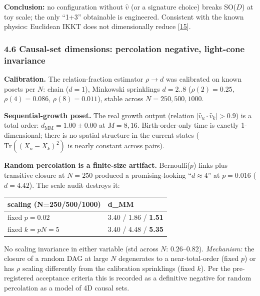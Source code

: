\textbf{Conclusion:} no configuration without \(\hat v\) (or a signature
choice) breaks SO(\(D\)) at toy scale; the only ``1+3'' obtainable is
engineered. Consistent with the known physics: Euclidean IKKT does not
dimensionally reduce {[}\hyperref[ref-15]{15}{]}.

\subsubsection{4.6 Causal-set dimensions: percolation negative,
light-cone
invariance}\label{causal-set-dimensions-percolation-negative-light-cone-invariance}

\textbf{Calibration.} The relation-fraction estimator \(\rho \to d\) was
calibrated on known posets per \(N\): chain (\(d{=}1\)), Minkowski
sprinklings \(d{=}2..8\) (\(\rho(2){=}0.25\), \(\rho(4){=}0.086\),
\(\rho(8){=}0.011\)), stable across \(N{=}250,500,1000\).

\textbf{Sequential-growth poset.} The real growth output (relation
\(|\hat v_u\cdot\hat v_k|>0.9\)) is a total order:
\textbf{\(d_{\mathrm{MM}}=1.00\pm0.00\)} at \(M=8,16\). Birth-order-only
time is exactly 1-dimensional; there is no spatial structure in the
current states (\(\mathrm{Tr}((X_u-X_k)^2)\) is nearly constant across
pairs).

\textbf{Random percolation is a finite-size artifact.} Bernoulli(\(p\))
links plus transitive closure at \(N=250\) produced a promising-looking
``\(d\approx4\)'' at \(p=0.016\) (\(d=4.42\)). The scale audit destroys
it:

{\def\LTcaptype{none} %
\begin{longtable}[]{@{}ll@{}}
\toprule\noalign{}
scaling (N=250/500/1000) & d\_MM \\
\midrule\noalign{}
\endhead
\bottomrule\noalign{}
\endlastfoot
fixed \(p=0.02\) & 3.40 / 1.86 / \textbf{1.51} \\
fixed \(k=pN=5\) & 3.40 / 4.48 / \textbf{5.35} \\
\end{longtable}
}

No scaling invariance in either variable (std across \(N\):
\(0.26\)--\(0.82\)). \emph{Mechanism:} the closure of a random DAG at
large \(N\) degenerates to a near-total-order (fixed \(p\)) or has
\(\rho\) scaling differently from the calibration sprinklings (fixed
\(k\)). Per the pre-registered acceptance criteria this is recorded as a
definitive negative for random percolation as a model of 4D causal sets.

